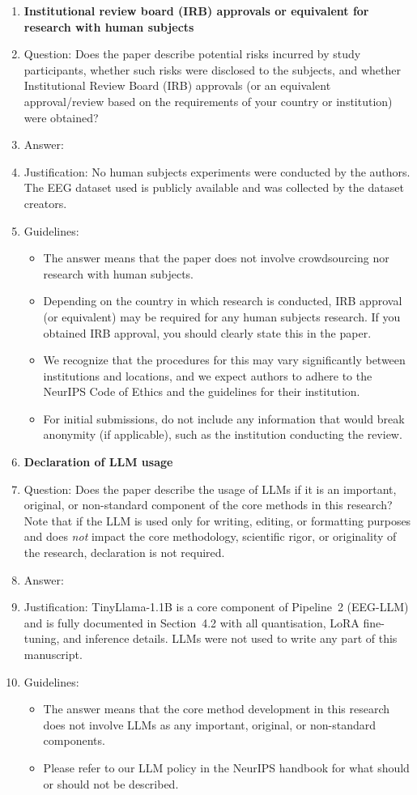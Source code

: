 \documentclass{article}
\begin{document}
\begin{enumerate}
\item {\bf Institutional review board (IRB) approvals or equivalent for research with human subjects}
    \item[] Question: Does the paper describe potential risks incurred by study participants, whether such risks were disclosed to the subjects, and whether Institutional Review Board (IRB) approvals (or an equivalent approval/review based on the requirements of your country or institution) were obtained?
    \item[] Answer: \answerNA{}
    \item[] Justification: No human subjects experiments were conducted by the authors. The EEG dataset used is publicly available and was collected by the dataset creators.
    \item[] Guidelines:
    \begin{itemize}
        \item The answer \answerNA{} means that the paper does not involve crowdsourcing nor research with human subjects.
        \item Depending on the country in which research is conducted, IRB approval (or equivalent) may be required for any human subjects research. If you obtained IRB approval, you should clearly state this in the paper.
        \item We recognize that the procedures for this may vary significantly between institutions and locations, and we expect authors to adhere to the NeurIPS Code of Ethics and the guidelines for their institution.
        \item For initial submissions, do not include any information that would break anonymity (if applicable), such as the institution conducting the review.
    \end{itemize}

\item {\bf Declaration of LLM usage}
    \item[] Question: Does the paper describe the usage of LLMs if it is an important, original, or non-standard component of the core methods in this research? Note that if the LLM is used only for writing, editing, or formatting purposes and does \emph{not} impact the core methodology, scientific rigor, or originality of the research, declaration is not required.
    \item[] Answer: \answerYes{}
    \item[] Justification: TinyLlama-1.1B is a core component of Pipeline~2 (EEG-LLM) and is fully documented in Section~4.2 with all quantisation, LoRA fine-tuning, and inference details. LLMs were not used to write any part of this manuscript.
    \item[] Guidelines:
    \begin{itemize}
        \item The answer \answerNA{} means that the core method development in this research does not involve LLMs as any important, original, or non-standard components.
        \item Please refer to our LLM policy in the NeurIPS handbook for what should or should not be described.
    \end{itemize}


\end{enumerate}
\end{document}
